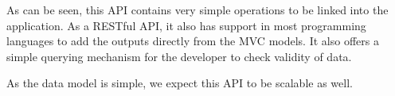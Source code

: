 As can be seen, this API contains very simple operations to be linked into
the application. As a RESTful API, it also has support in most programming
languages to add the outputs directly from the MVC models. It also offers
a simple querying mechanism for the developer to check validity of data.

As the data model is simple, we expect this API to be scalable as well.
